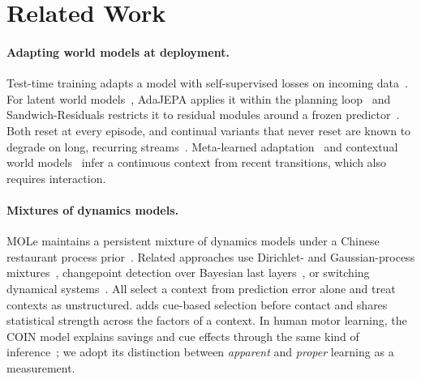 \section{Related Work}\label{sec:related}

\paragraph{Adapting world models at deployment.}
Test-time training adapts a model with self-supervised losses on incoming data~\citep{sun2020ttt,wang2021tent}. For latent world models~\citep{hafner2025dreamerv3,hansen2024tdmpc2,zhou2025dinowm}, AdaJEPA applies it within the planning loop~\citep{wang2026adajepa} and Sandwich-Residuals restricts it to residual modules around a frozen predictor~\citep{soni2026sandwich}. Both reset at every episode, and continual variants that never reset are known to degrade on long, recurring streams~\citep{wang2022cotta,press2023rdumb,hoang2024petta}. Meta-learned adaptation~\citep{nagabandi2018learning,kumar2021rma} and contextual world models~\citep{lee2020context,roder2025dali,benad2026dmash} infer a continuous context from recent transitions, which also requires interaction.

\paragraph{Mixtures of dynamics models.}
MOLe maintains a persistent mixture of dynamics models under a Chinese restaurant process prior~\citep{nagabandi2019mole}. Related approaches use Dirichlet- and Gaussian-process mixtures~\citep{xu2020taskagnostic,jerfel2019reconciling,lee2020cndpm}, changepoint detection over Bayesian last layers~\citep{harrison2018alpaca,harrison2020moca}, or switching dynamical systems~\citep{fox2011bnpslds,linderman2017rslds}. All select a context from prediction error alone and treat contexts as unstructured. \method adds cue-based selection before contact and shares statistical strength across the factors of a context. In human motor learning, the COIN model explains savings and cue effects through the same kind of inference~\citep{heald2021coin,heald2023annurev}; we adopt its distinction between \emph{apparent} and \emph{proper} learning as a measurement.


